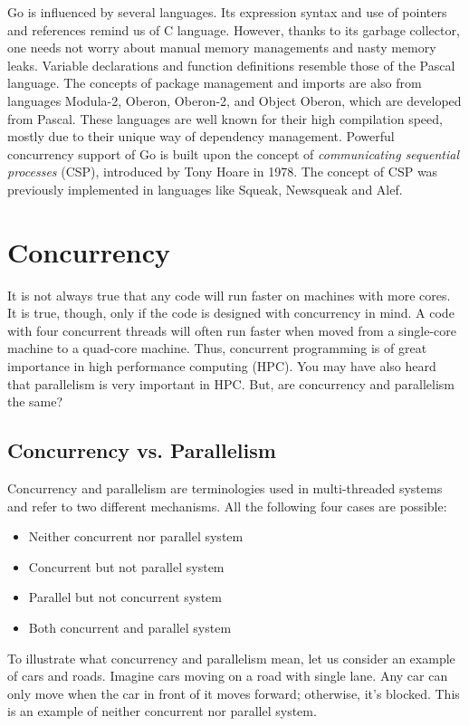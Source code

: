 \documentclass[11pt]{article}
\begin{document}
Go is influenced by several languages. Its expression syntax and use of pointers and references remind us of C language. However, thanks to its garbage collector, one needs not worry about manual memory managements and nasty memory leaks. Variable declarations and function definitions resemble those of the Pascal language. The concepts of package management and imports are also from languages Modula-2, Oberon, Oberon-2, and Object Oberon, which are developed from Pascal. These languages are well known for their high compilation speed, mostly due to their unique way of dependency management. Powerful concurrency support of Go is built upon the concept of \emph{communicating sequential processes} (CSP), introduced by Tony Hoare in 1978. The concept of CSP was previously implemented in languages like Squeak, Newsqueak and Alef.

\section*{Concurrency}
\label{sec:orgheadline6}
It is not always true that any code will run faster on machines with more cores. It is true, though, only if the code is designed with concurrency in mind. A code with four concurrent threads will often run faster when moved from a single-core machine to a quad-core machine. Thus, concurrent programming is of great importance in high performance computing (HPC). You may have also heard that parallelism is very important in HPC. But, are concurrency and parallelism the same?

\subsection*{Concurrency vs. Parallelism}
\label{sec:orgheadline2}
Concurrency and parallelism are terminologies used in multi-threaded systems and refer to two different mechanisms. All the following four cases are possible:
\begin{itemize}
\item Neither concurrent nor parallel system
\item Concurrent but not parallel system
\item Parallel but not concurrent system
\item Both concurrent and parallel system
\end{itemize}
To illustrate what concurrency and parallelism mean, let us consider an example of cars and roads. Imagine cars moving on a road with single lane. Any car can only move when the car in front of it moves forward; otherwise, it's blocked. This is an example of neither concurrent nor parallel system.
\end{document}
